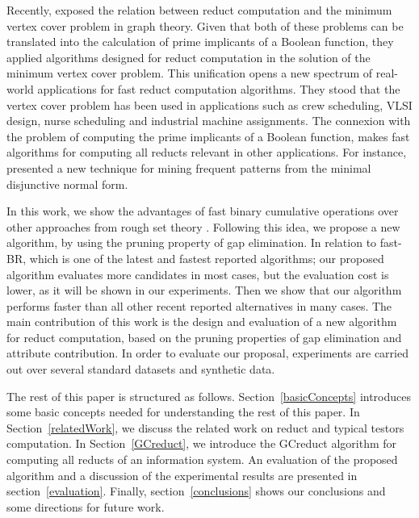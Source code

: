 \documentclass[authoryear,preprint,review,12pt]{elsarticle}
\begin{document}
  Recently, \cite{chen2015} exposed the relation between reduct computation and the minimum vertex cover
  problem in graph theory. Given that both of these problems can be translated into the calculation of
  prime implicants of a Boolean function, they applied algorithms designed for reduct computation in the
  solution of the minimum vertex cover problem. This unification opens a new spectrum of real-world applications
  for fast reduct computation algorithms. They stood that the vertex cover problem has been used in applications 
  such as crew scheduling, VLSI design, nurse scheduling and industrial machine assignments.
  The connexion with the problem of computing the prime implicants of a Boolean function, makes fast 
  algorithms for computing all reducts relevant in other applications. For instance, \cite{Li2015} presented
  a new technique for mining frequent patterns from the minimal disjunctive normal form.

  In this work, we show the advantages of fast binary cumulative operations \citep{Sanchez10,Lias13} over other 
  approaches from rough set theory \citep{WangP07,Jensen14}. Following this idea, we propose a new algorithm, by using the pruning property of gap elimination. In relation to fast-BR, which is one of the latest and fastest reported algorithms; our proposed algorithm evaluates more candidates in most cases, but the evaluation cost is lower, as it will be shown in our experiments. Then we show that our algorithm performs faster than all other recent reported alternatives in
  many cases. 
  The main contribution of this work is the design and evaluation of a new algorithm for reduct computation,
  based on  the pruning properties of gap elimination and attribute contribution. In order to evaluate our proposal, experiments are carried out over several standard datasets \citep{Bache13} and synthetic data.
  
  The rest of this paper is structured as follows. Section~\ref{basicConcepts}  introduces some basic concepts needed for understanding the rest of this paper. In Section~\ref{relatedWork}, we discuss the related work on reduct and typical testors computation.  In Section~\ref{GCreduct}, we introduce the GCreduct algorithm for computing all reducts of an information system. An evaluation of the proposed algorithm and a discussion of the experimental results are presented in section~\ref{evaluation}. Finally, section~\ref{conclusions} shows our conclusions and some directions for future work.
   
\end{document}
